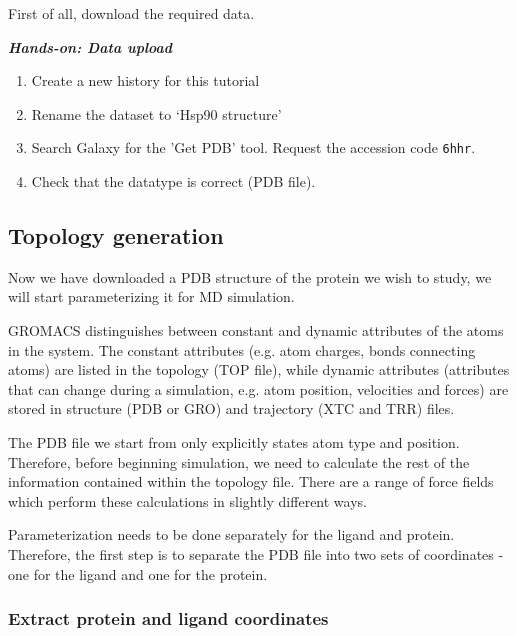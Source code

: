 \documentclass[twocolumn]{bmcart}%
\providecommand{\tightlist}{%
  \setlength{\itemsep}{0pt}\setlength{\parskip}{0pt}}
\providecommand{\tightlist}{%
  \setlength{\itemsep}{0pt}\setlength{\parskip}{0pt}}
\begin{document}
First of all, download the required data.

\textbf{\emph{Hands-on: Data upload}}

\begin{enumerate}
\def\labelenumi{\arabic{enumi}.}
\tightlist
\item
  Create a new history for this tutorial

\item
  Rename the dataset to `Hsp90 structure'
\item
  Search Galaxy for the 'Get PDB' tool. Request the accession code \texttt{6hhr}.
\item
  Check that the datatype is correct (PDB file).
\end{enumerate}

\subsection{Topology generation}\label{topology-generation}

Now we have downloaded a PDB structure of the protein we wish to study, we will start parameterizing it for MD simulation.

GROMACS distinguishes between constant and dynamic attributes of the
atoms in the system. The constant attributes (e.g. atom charges, bonds
connecting atoms) are listed in the topology (TOP file), while dynamic
attributes (attributes that can change during a simulation, e.g. atom
position, velocities and forces) are stored in structure (PDB or GRO)
and trajectory (XTC and TRR) files.

The PDB file we start from only explicitly states atom type and
position. Therefore, before beginning simulation, we need to calculate
the rest of the information contained within the topology file. There
are a range of force fields which perform these calculations in slightly
different ways.


Parameterization needs to be done separately for the ligand and protein.
Therefore, the first step is to separate the PDB file into two sets of
coordinates - one for the ligand and one for the protein.

\subsubsection{Extract protein and ligand
coordinates}\label{extract-protein-and-ligand-coordinates}
\end{document}
